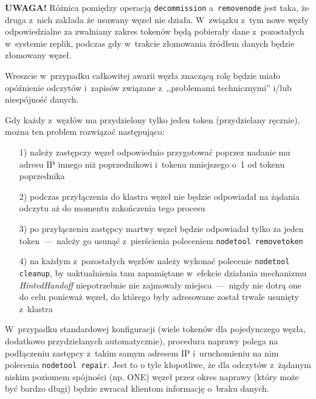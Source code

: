 \documentclass{article} %
\begin{document}
\bigskip

\noindent\textbf{UWAGA!} Różnica pomiędzy operacją \texttt{decommission} a~\texttt{removenode} jest taka, że druga z~nich zakłada że usuwany węzeł nie działa.
W~związku z~tym nowe węzły odpowiedzialne za zwalniany zakres tokenów będą pobierały dane z~pozostałych w~systemie replik, podczas gdy w~trakcie złomowania źródłem danych będzie złomowany węzeł.

\bigskip

Wreszcie w~przypadku całkowitej awarii węzła znaczącą rolę będzie miało opóźnienie odczytów i~zapisów związane z~,,problemami technicznymi'' i/lub niespójność danych.

Gdy każdy z~węzłów ma przydzielony tylko jeden token (przydzielany ręcznie), można ten problem rozwiązać następująco:
\begin{enumerate}
\item[1)] należy zastępczy węzeł odpowiednio przygotować poprzez nadanie mu adresu IP innego niż poprzednikowi i~tokenu mniejszego o~1 od tokenu poprzednika
\item[2)] podczas przyłączenia do klastra węzeł nie będzie odpowiadał na żądania odczytu aż do momentu zakończenia tego procesu
\item[3)] po przyłączeniu zastępcy martwy węzeł będzie odpowiadał tylko za jeden token~---~należy go usunąć z~pierścienia poleceniem \texttt{nodetool removetoken}
\item[4)] na każdym z~pozostałych węzłów należy wykonać polecenie \texttt{nodetool cleanup}, by uaktualnienia tam zapamiętane w~efekcie działania mechanizmu \emph{HintedHandoff} niepotrzebnie nie zajmowały miejsca~---~nigdy nie dotrą one do celu ponieważ węzeł, do którego były adresowane został trwale usunięty z~klastra
\end{enumerate}

W~przypadku standardowej konfiguracji (wiele tokenów dla pojedynczego węzła, dodatkowo przydzielanych automatycznie), procedura naprawy polega na podłączeniu zastępcy z~takim samym adresem IP i~uruchomieniu na nim polecenia \texttt{nodetool repair}.
Jest to o tyle kłopotliwe, że dla odczytów z~żądanym niskim poziomem spójności (np. ONE) węzeł przez okres naprawy (który może być bardzo długi) będzie zwracał klientom informację o~braku danych.

\pagebreak
\end{document}
